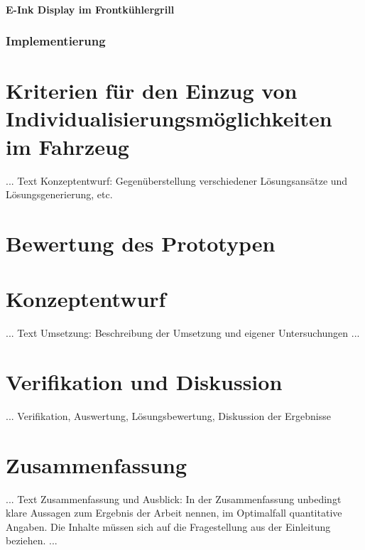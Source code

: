\subsubsection{E-Ink Display im Frontkühlergrill}
\subsection{Implementierung}


\chapter{Kriterien für den Einzug von Individualisierungsmöglichkeiten im Fahrzeug }
\label{cha:Kriterien}

... Text Konzeptentwurf: Gegenüberstellung verschiedener Lösungsansätze und Lösungsgenerierung, etc.

\chapter{Bewertung des Prototypen}
\label{cha:Bewertung}

\chapter{Konzeptentwurf}
\label{cha:Konzeptentwurf}

... Text Umsetzung: Beschreibung der Umsetzung und eigener Untersuchungen ...



\chapter{Verifikation und Diskussion}
\label{cha:Verifikation}

... Verifikation, Auswertung, Lösungsbewertung, Diskussion der Ergebnisse

\chapter{Zusammenfassung}
\label{cha:zusammenfassung}

... Text Zusammenfassung und Ausblick: In der Zusammenfassung unbedingt klare Aussagen zum Ergebnis der Arbeit nennen, im Optimalfall quantitative Angaben. Die Inhalte müssen sich auf die Fragestellung aus der Einleitung  beziehen. ...
